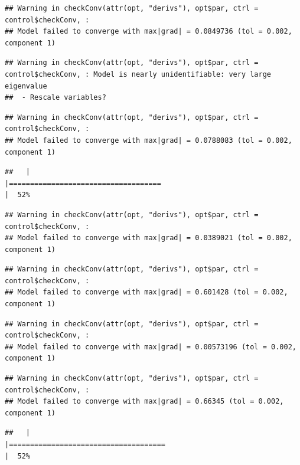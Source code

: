 \documentclass[
  12pt,
]{book}
\begin{document}
\begin{verbatim}
## Warning in checkConv(attr(opt, "derivs"), opt$par, ctrl = control$checkConv, :
## Model failed to converge with max|grad| = 0.0849736 (tol = 0.002, component 1)
\end{verbatim}

\begin{verbatim}
## Warning in checkConv(attr(opt, "derivs"), opt$par, ctrl = control$checkConv, : Model is nearly unidentifiable: very large eigenvalue
##  - Rescale variables?
\end{verbatim}

\begin{verbatim}
## Warning in checkConv(attr(opt, "derivs"), opt$par, ctrl = control$checkConv, :
## Model failed to converge with max|grad| = 0.0788083 (tol = 0.002, component 1)
\end{verbatim}

\begin{verbatim}
##   |                                                                              |====================================                                  |  52%
\end{verbatim}

\begin{verbatim}
## Warning in checkConv(attr(opt, "derivs"), opt$par, ctrl = control$checkConv, :
## Model failed to converge with max|grad| = 0.0389021 (tol = 0.002, component 1)
\end{verbatim}

\begin{verbatim}
## Warning in checkConv(attr(opt, "derivs"), opt$par, ctrl = control$checkConv, :
## Model failed to converge with max|grad| = 0.601428 (tol = 0.002, component 1)
\end{verbatim}

\begin{verbatim}
## Warning in checkConv(attr(opt, "derivs"), opt$par, ctrl = control$checkConv, :
## Model failed to converge with max|grad| = 0.00573196 (tol = 0.002, component 1)
\end{verbatim}

\begin{verbatim}
## Warning in checkConv(attr(opt, "derivs"), opt$par, ctrl = control$checkConv, :
## Model failed to converge with max|grad| = 0.66345 (tol = 0.002, component 1)
\end{verbatim}

\begin{verbatim}
##   |                                                                              |=====================================                                 |  52%
\end{verbatim}
\end{document}
